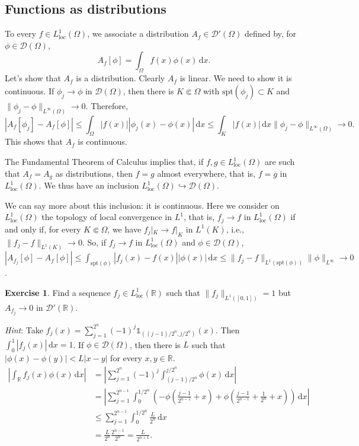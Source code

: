 \documentclass[a4paper,9pt]{amsart}
\newcommand{\scr}[1]{\mathscr{#1}}
\newcommand{\R}{\mathbb{R}}	%
\newcommand{\did}{\,\mathrm{d}}	%
\newcommand{\into}{\hookrightarrow}		%
\newcommand{\spt}{\mathrm{spt}}
\newcommand{\loc}{\mathrm{loc}}
\newcommand{\one}{{\mathds 1\!}}
\theoremstyle{plain}
\theoremstyle{definition}
\newtheorem{exercise}[proposition]{Exercise}%
\theoremstyle{remark}
\begin{document}
\subsection{Functions as distributions}\label{sub67def4a2}
To every $f\in L^1_\loc(\Omega)$, we associate a distribution $A_f\in \scr D'(\Omega)$ defined by, for $\phi\in\scr D(\Omega)$,
\begin{equation}
	A_f[\phi] = \int_\Omega f(x) \phi(x) \did x .
\end{equation}
Let's show that $A_f$ is a distribution.
Clearly $A_f$ is linear. We need to show it is continuous.
If $\phi_j\to \phi$ in $\scr D(\Omega)$, then there is $K\Subset\Omega$ with $\spt(\phi_j)\subset K$ and $\|\phi_j-\phi\|_{L^\infty(\Omega)} \to 0$.
Therefore, 
\begin{equation}
	|A_f[\phi_j] - A_f[\phi]|
	\le \int_\Omega |f(x)| |\phi_j(x) - \phi(x)| \did x
	\le \int_K |f(x)|\did x \|\phi_j-\phi\|_{L^\infty(\Omega)}
	\to 0 .
\end{equation}
This shows that $A_f$ is continuous.

The Fundamental Theorem of Calculus implies that, if $f,g\in L^1_\loc(\Omega)$ are such that $A_f = A_g$ as distributions, then $f=g$ almost everywhere, that is, $f=g$ in $L^1_\loc(\Omega)$.
We thus have an inclusion $L^1_\loc(\Omega)\into \scr D(\Omega)$.

We can say more about this inclusion: it is continuous.
Here we consider on $L^1_\loc(\Omega)$ the topology of local convergence in $L^1$, that is, $f_j\to f$ in $L^1_\loc(\Omega)$ if and only if, for every $K\Subset\Omega$, we have $f_j|_K\to f|_K$ in $L^1(K)$, i.e., $\|f_j-f\|_{L^1(K)} \to 0$.
So, if $f_j\to f$ in $L^1_\loc(\Omega)$ and $\phi\in\scr D(\Omega)$, 
$| A_{f_j}[\phi] - A_{f}[\phi] | \le \int_{\spt(\phi)} |f_j(x)-f(x)| |\phi(x)| \did x 
\le \|f_j-f\|_{L^1(\spt(\phi))} \|\phi\|_{L^\infty} \to 0$.

\begin{exercise}
	Find a sequence $f_j\in L^1_\loc(\R)$ such that $\|f_j\|_{L^1([0,1])}=1$ but $A_{f_j}\to 0$ in $\scr D'(\R)$.
	
	{\it Hint}:
	Take $f_j(x) = \sum_{j=1}^{2^n} (-1)^j \one_{((j-1)/2^n,j/2^n)}(x)$.
	Then $\int_0^1|f_j(x)| \did x = 1$.
	If $\phi\in\scr D(\Omega)$, then there is $L$ such that $|\phi(x)-\phi(y)|<L|x-y|$
	for every $x,y\in\R$.
	\begin{align*}
	 	\left| \int_\R f_j(x)\phi(x) \did x \right|
		&= \left| \sum_{j=1}^{2^n} (-1)^j \int_{(j-1)/2^n}^{j/2^n} \phi(x)\did x \right|\\
		&= \left| \sum_{j=1}^{2^{n-1}} \int_{0}^{1/2^n} \left(- \phi\left(\frac{j-1}{2^{n-1}} + x \right) + \phi\left(\frac{j-1}{2^{n-1}} + \frac{1}{2^n} + x \right) \right)\did x \right|\\
		&\le \sum_{j=1}^{2^{n-1}} \int_{0}^{1/2^n} \frac{L}{2^n} \did x \\
		&= \frac{L}{2^n} \frac{2^{n-1}}{2^n} = \frac{L}{2^{n+1}} .
	\end{align*}
\end{exercise}
\end{document}
